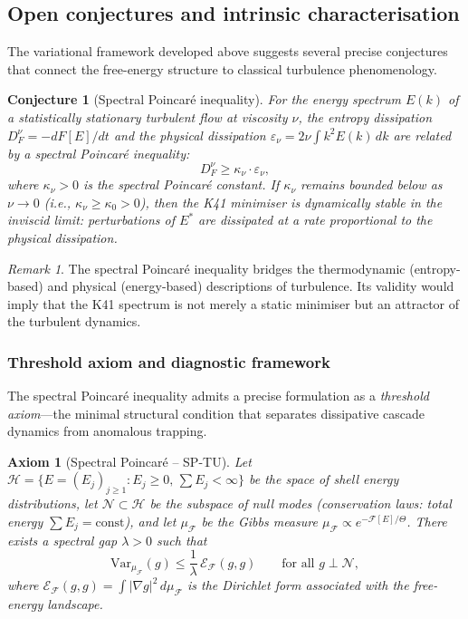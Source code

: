 \documentclass[12pt,a4paper]{article}
\theoremstyle{definition}
\theoremstyle{plain}
\newtheorem{conjecture}[definition]{Conjecture}
\newtheorem{axiom}[definition]{Axiom}
\theoremstyle{remark}
\newtheorem{remark}[definition]{Remark}
\begin{document}
\subsection{Open conjectures and intrinsic characterisation}\label{sec:open-conjectures}

The variational framework developed above suggests several precise conjectures
that connect the free-energy structure to classical turbulence phenomenology.

\begin{conjecture}[Spectral Poincar\'e inequality]
\label{conj:spectral-poincare}
For the energy spectrum $E(k)$ of a statistically stationary turbulent flow at viscosity $\nu$, the entropy dissipation $D_F^\nu = -dF[E]/dt$ and the physical dissipation $\varepsilon_\nu = 2\nu \int k^2 E(k)\, dk$ are related by a spectral Poincar\'e inequality:
\[
D_F^\nu \geq \kappa_\nu \cdot \varepsilon_\nu,
\]
where $\kappa_\nu > 0$ is the spectral Poincar\'e constant. If $\kappa_\nu$ remains bounded below as $\nu \to 0$ (i.e., $\kappa_\nu \geq \kappa_0 > 0$), then the K41 minimiser is dynamically stable in the inviscid limit: perturbations of $E^*$ are dissipated at a rate proportional to the physical dissipation.
\end{conjecture}

\begin{remark}
The spectral Poincar\'e inequality bridges the thermodynamic (entropy-based) and physical (energy-based) descriptions of turbulence. Its validity would imply that the K41 spectrum is not merely a static minimiser but an attractor of the turbulent dynamics.
\end{remark}

\subsubsection*{Threshold axiom and diagnostic framework}

The spectral Poincar\'e inequality admits a precise formulation as a \emph{threshold axiom}---the minimal structural condition that separates dissipative cascade dynamics from anomalous trapping.

\begin{axiom}[Spectral Poincar\'e -- SP-TU]\label{ax:sp-tu}
Let $\mathcal{H} = \{E = (E_j)_{j \geq 1} : E_j \geq 0,\, \sum E_j < \infty\}$ be the space of shell energy distributions, let $\mathcal{N} \subset \mathcal{H}$ be the subspace of null modes (conservation laws: total energy $\sum E_j = \mathrm{const}$), and let $\mu_{\mathcal{F}}$ be the Gibbs measure $\mu_{\mathcal{F}} \propto e^{-\mathcal{F}[E]/\Theta}$. There exists a spectral gap $\lambda > 0$ such that
\begin{equation}\label{eq:sp-tu}
  \mathrm{Var}_{\mu_{\mathcal{F}}}(g) \leq \frac{1}{\lambda}\, \mathcal{E}_{\mathcal{F}}(g, g) \qquad \text{for all } g \perp \mathcal{N},
\end{equation}
where $\mathcal{E}_{\mathcal{F}}(g,g) = \int |\nabla g|^2\, d\mu_{\mathcal{F}}$ is the Dirichlet form associated with the free-energy landscape.
\end{axiom}
\end{document}
